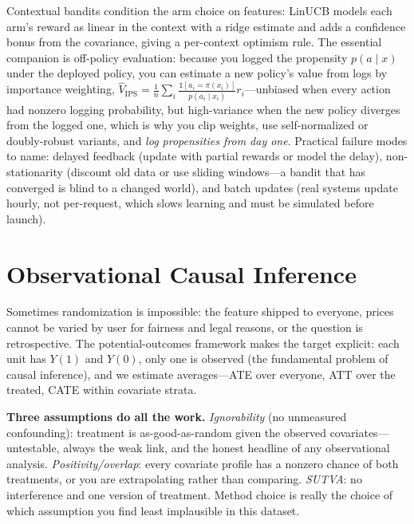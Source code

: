 Contextual bandits condition the arm choice on features: LinUCB models each arm's reward as linear in the context with a ridge estimate and adds a confidence bonus from the covariance, giving a per-context optimism rule. The essential companion is off-policy evaluation: because you logged the propensity $p(a \mid x)$ under the deployed policy, you can estimate a new policy's value from logs by importance weighting, $\hat V_{\text{IPS}} = \frac{1}{n}\sum_i \frac{\mathbb{1}[a_i = \pi(x_i)]}{p(a_i \mid x_i)} r_i$---unbiased when every action had nonzero logging probability, but high-variance when the new policy diverges from the logged one, which is why you clip weights, use self-normalized or doubly-robust variants, and \emph{log propensities from day one}. Practical failure modes to name: delayed feedback (update with partial rewards or model the delay), non-stationarity (discount old data or use sliding windows---a bandit that has converged is blind to a changed world), and batch updates (real systems update hourly, not per-request, which slows learning and must be simulated before launch).

\section{Observational Causal Inference}
\label{cml:sec:observational}

Sometimes randomization is impossible: the feature shipped to everyone, prices cannot be varied by user for fairness and legal reasons, or the question is retrospective. The potential-outcomes framework makes the target explicit: each unit has $Y(1)$ and $Y(0)$, only one is observed (the fundamental problem of causal inference), and we estimate averages---ATE over everyone, ATT over the treated, CATE within covariate strata.

\begin{keyinsight}
\textbf{Three assumptions do all the work.} \emph{Ignorability} (no unmeasured confounding): treatment is as-good-as-random given the observed covariates---untestable, always the weak link, and the honest headline of any observational analysis. \emph{Positivity/overlap}: every covariate profile has a nonzero chance of both treatments, or you are extrapolating rather than comparing. \emph{SUTVA}: no interference and one version of treatment. Method choice is really the choice of which assumption you find least implausible in this dataset.
\end{keyinsight}

